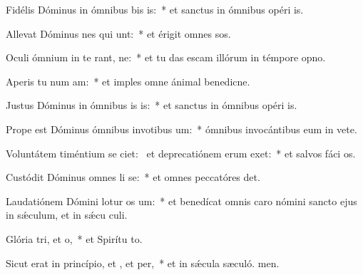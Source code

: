 \item Fidélis Dóminus in ómnibus bis is:~* et sanctus in ómnibus opéri is.
\item Allevat Dóminus nes qui unt:~* et érigit omnes sos.
\item Oculi ómnium in te rant, ne:~* et tu das escam illórum in témpore opno.
\item Aperis tu num am:~* et imples omne ánimal benedicne.
\item Justus Dóminus in ómnibus is is:~* et sanctus in ómnibus opéri is.
\item Prope est Dóminus ómnibus invotibus um:~* ómnibus invocántibus eum in vete.
\item Voluntátem timéntium se ciet:~\pscross{} et deprecatiónem erum exet:~* et salvos fáci os.
\item Custódit Dóminus omnes li se:~* et omnes peccatóres det.
\item Laudatiónem Dómini lotur os um:~* et benedícat omnis caro nómini sancto ejus in sǽculum, et in sǽcu culi.
\item Glória tri, et o,~* et Spirítu to.
\item Sicut erat in princípio, et , et per,~* et in sǽcula sæculó. men.
